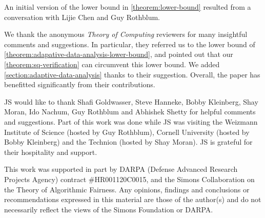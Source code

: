 {\small
	An initial version of the lower bound in \cref{theorem:lower-bound} resulted from a conversation with Lijie Chen and Guy Rothblum. 

	We thank the anonymous \emph{Theory of Computing} reviewers for many insightful comments and suggestions. In particular, they referred us to the lower bound of \cref{theorem:adapative-data-analysis-lower-bound}, and pointed out that our \cref{theorem:sq-verification} can circumvent this lower bound. We added \cref{section:adaptive-data-analysis} thanks to their suggestion. Overall, the paper has benefitted significantly from their contributions.

	JS would like to thank 
	Shafi Goldwasser,
	Steve Hanneke,
	Bobby Kleinberg,
	Shay Moran,
	Ido Nachum,
	Guy Rothblum
	and
	Abhishek Shetty
	for helpful comments and suggestions. Part of this work was done while JS was visiting the Weizmann Institute of Science (hosted by Guy Rothblum), Cornell University (hosted by Bobby Kleinberg) and the Technion (hosted by Shay Moran). JS is grateful for their hospitality and support.

	This work was supported in part by DARPA (Defense Advanced Research Projects Agency) contract \#HR001120C0015, and the Simons Collaboration on the Theory of Algorithmic Fairness. Any opinions, findings and conclusions or recommendations expressed in this material are those of the author(s) and do not necessarily reflect the views of the Simons Foundation or DARPA.
}

%
